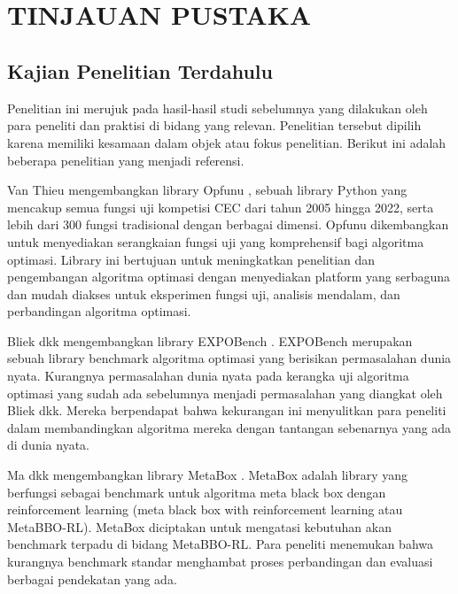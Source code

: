 
\chapter[TINJAUAN PUSTAKA]{\\ TINJAUAN PUSTAKA}

\section{Kajian Penelitian Terdahulu}
Penelitian ini merujuk pada hasil-hasil studi sebelumnya yang dilakukan oleh para peneliti dan praktisi di bidang yang relevan. Penelitian tersebut dipilih karena memiliki kesamaan dalam objek atau fokus penelitian. Berikut ini adalah beberapa penelitian yang menjadi referensi.

Van Thieu mengembangkan library Opfunu \citep{Van_Thieu_2024}, sebuah library Python yang mencakup semua fungsi uji kompetisi CEC dari tahun 2005 hingga 2022, serta lebih dari 300 fungsi tradisional dengan berbagai dimensi. Opfunu dikembangkan untuk menyediakan serangkaian fungsi uji yang komprehensif bagi algoritma optimasi. Library ini bertujuan untuk meningkatkan penelitian dan pengembangan algoritma optimasi dengan menyediakan platform yang serbaguna dan mudah diakses untuk eksperimen fungsi uji, analisis mendalam, dan perbandingan algoritma optimasi.

Bliek dkk mengembangkan library EXPOBench \citep{Bliek_2023}. EXPOBench merupakan sebuah library
benchmark algoritma optimasi yang berisikan permasalahan dunia nyata. Kurangnya permasalahan
dunia nyata pada kerangka uji algoritma optimasi yang sudah ada sebelumnya menjadi permasalahan
yang diangkat oleh Bliek dkk. Mereka berpendapat bahwa kekurangan ini menyulitkan para peneliti
dalam membandingkan algoritma mereka dengan tantangan sebenarnya yang ada di dunia nyata.

Ma dkk mengembangkan library MetaBox \citep{ma_zeyan_guo_chen_jiacheng_zhenrui_peng_gong_ma_cao_2023}. MetaBox adalah library yang berfungsi sebagai benchmark untuk algoritma meta black box dengan reinforcement learning (meta black box with reinforcement learning atau MetaBBO-RL). MetaBox diciptakan untuk mengatasi kebutuhan akan benchmark terpadu di bidang MetaBBO-RL. Para peneliti menemukan bahwa kurangnya benchmark standar menghambat proses perbandingan dan evaluasi berbagai pendekatan yang ada.

